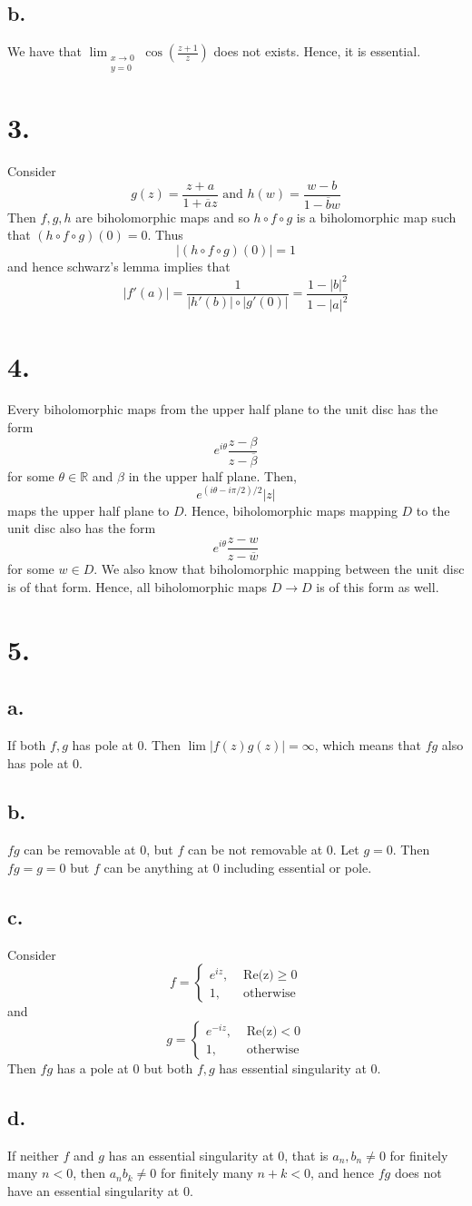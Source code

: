 \documentclass[11pt]{article}
\begin{document}
\subsection*{b.} 
We have that $\lim_{\substack{x \to 0 \\ y =0}} \cos\left(\frac{z+1}{z} \right)$ does not exists. Hence, it is essential.
\newpage
\section*{3.}
Consider 
\[
    g(z) = \frac{z+a}{1+\overline{a}z} \text{ and } h(w) = \frac{w-b}{1-\overline{b}w}    
\]
Then $f,g,h$ are biholomorphic maps and so $h \circ f \circ g$ is a biholomorphic map such that $(h\circ f \circ g)(0) = 0$. Thus
\[
    |(h \circ f \circ g)(0)| = 1    
\]
and hence schwarz's lemma implies that 
\[
    |f'(a)| =  \frac{1}{|h'(b)| \circ |g'(0)|} = \frac{1-|b|^2}{1-|a|^2}
\]
\newpage
\section*{4.}
Every biholomorphic maps from the upper half plane to the unit disc has the form 
\[
    e^{i\theta} \frac{z-\beta}{z - \overline{\beta}}
\]
for some $\theta \in \mathbb{R}$ and $\beta$ in the upper half plane. Then, 
\[
    e^{(i\theta - i\pi/2)/2}|z|
\]
maps the upper half plane to $D$. Hence, biholomorphic maps mapping $D$ to the unit disc also has the form 
\[
    e^{i\theta} \frac{z-w}{z-\overline{w}}    
\]
for some $w \in D$. We also know that biholomorphic mapping between the unit disc is of that form. Hence, all biholomorphic maps $D \to D$ is of this form as well.
\newpage
\section*{5.}
\subsection*{a.}
If both $f,g$ has pole at $0$. Then $\lim |f(z)g(z)| = \infty$, which means that $fg$ also has pole at $0$.
\subsection*{b.}
$fg$ can be removable at 0, but $f$ can be not removable at $0$. Let $g = 0$. Then $fg = g = 0$ but $f$ can be anything at $0$ including essential or pole.
\subsection*{c.}
Consider 
\[
    f = 
    \begin{cases} 
        e^{iz}, &\text{ Re(z)} \ge 0  \\
        1, &\text{ otherwise}
    \end{cases}
\]
and 
\[
    g = 
    \begin{cases} 
        e^{-iz}, &\text{ Re(z)} < 0 \\
        1, &\text{ otherwise}
    \end{cases}
\]
Then $fg$ has a pole at $0$ but both $f,g$ has essential singularity at $0$. 
\subsection*{d.}
If neither $f$ and $g$ has an essential singularity at $0$, that is $a_n, b_n \ne 0$ for finitely many $n<0$, then $a_n b_k \ne 0$ for finitely many $n+k<0$, and hence $fg$ does not have an essential singularity at $0$.
\end{document}
